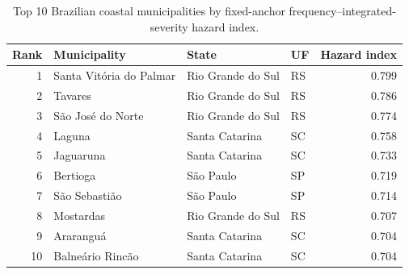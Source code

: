 \begin{table}[htbp]
\caption{Top 10 Brazilian coastal municipalities by fixed-anchor frequency–integrated-severity hazard index.}
\label{tab:top10-municipal-hazard}
\begin{tabular}{rlllr}
\toprule
Rank & Municipality & State & UF & Hazard index \\
\midrule
1 & Santa Vitória do Palmar & Rio Grande do Sul & RS & 0.799 \\
2 & Tavares & Rio Grande do Sul & RS & 0.786 \\
3 & São José do Norte & Rio Grande do Sul & RS & 0.774 \\
4 & Laguna & Santa Catarina & SC & 0.758 \\
5 & Jaguaruna & Santa Catarina & SC & 0.733 \\
6 & Bertioga & São Paulo & SP & 0.719 \\
7 & São Sebastião & São Paulo & SP & 0.714 \\
8 & Mostardas & Rio Grande do Sul & RS & 0.707 \\
9 & Araranguá & Santa Catarina & SC & 0.704 \\
10 & Balneário Rincão & Santa Catarina & SC & 0.704 \\
\bottomrule
\end{tabular}
\end{table}
